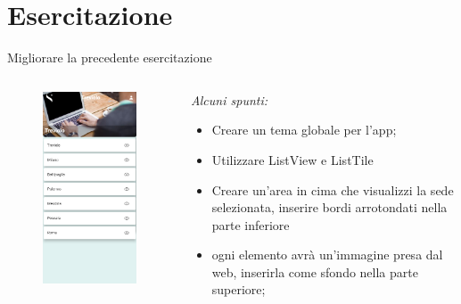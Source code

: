 \documentclass{../libs/presentation_format}
\begin{document}
\section{Esercitazione}
\begin{frame}{Migliorare la precedente esercitazione}
\begin{minipage}[0.2\textheight]{\textwidth}
		\begin{columns}[T]
			\begin{column}{0.4\textwidth}
				\begin{figure}[htpb]
					\centering
					\includegraphics[scale=0.2]{../libs/assignment-2-home}
				\end{figure}
			\end{column}
			\begin{column}{0.6\textwidth}
				\emph{Alcuni spunti:}
				\begin{itemize}
					\item Creare un tema globale per l'app;
					\item Utilizzare ListView e ListTile
					\item Creare un'area in cima che visualizzi la sede selezionata, inserire bordi arrotondati nella parte inferiore
					\item ogni elemento avrà un'immagine presa dal web, inserirla come sfondo nella parte superiore;
				\end{itemize}
			\end{column}
		\end{columns}
	\end{minipage}
\end{frame}
\end{document}
